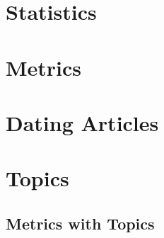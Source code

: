 \documentclass[a4paper,11pt] {article}
\begin{document}
\tableofcontents
\newpage{}




\section{Statistics}








\section{Metrics}\label{metrics}



\section{Dating Articles}


\section{Topics}


\subsection{Metrics with Topics}





\end{document}
